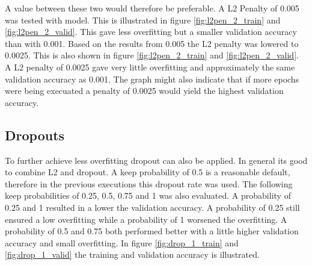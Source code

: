 

A value between these two  would therefore be preferable. A L2 Penalty of 0.005 was tested with model. This is illustrated in figure \ref{fig:l2pen_2_train} and \ref{fig:l2pen_2_valid}. This gave less overfitting but a smaller validation accuracy than with 0.001. Based on the results from 0.005 the L2 penalty was lowered to 0.0025. This is also shown in figure \ref{fig:l2pen_2_train} and \ref{fig:l2pen_2_valid}. A L2 penalty of 0.0025 gave very little overfitting and approximately the same validation accuracy as 0.001. The graph might also indicate that if more epochs were being execuated a penalty of 0.0025 would yield the highest validation accuracy.



\FloatBarrier
\subsection{Dropouts}
To further achieve less overfitting dropout can also be applied. In general its good to combine L2 and dropout. A keep probability of 0.5 is a reasonable default, therefore in the previous executions this dropout rate was used. The following keep probabilities of 0.25, 0.5, 0.75 and 1 was also evaluated. A probability of 0.25 and 1 resulted in a lower the validation accuracy. A probability of 0.25 still ensured a low overfitting while a probability of 1 worsened the overfitting. A probability of 0.5 and 0.75 both performed better with a little higher validation accuracy and small overfitting. In figure \ref{fig:drop_1_train} and \ref{fig:drop_1_valid} the training and validation accuracy is illustrated.


